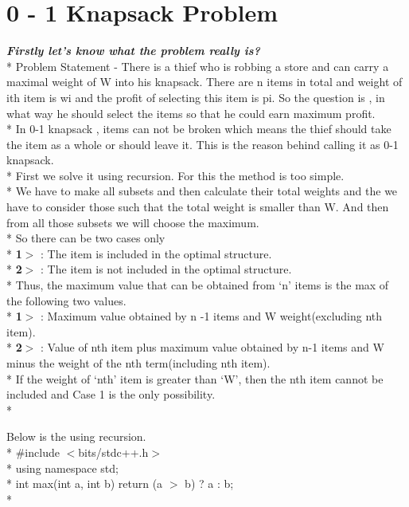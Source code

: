 \documentclass[12pt]{book}
\begin{document}
\chapter{0 - 1 Knapsack Problem}
\textbf{\textit{Firstly let’s know what the problem really is?}} \\*
\newline
Problem Statement - There is a thief who is robbing a store and can carry a maximal weight of W into his knapsack. There are n items in total and weight of ith item is wi and the profit of selecting this item is pi. So the question is , in what way he should select the items so that he could earn  maximum profit.\\*
\newline
In 0-1 knapsack , items can not be broken which means the thief should take the item as a whole or should leave it. This is the reason behind calling it as 0-1 knapsack.\\*
\newline
First we solve it using recursion. For this the method is too simple.\\*
\newline
We have to make all subsets and then calculate their total weights and the we have to consider those such that the total weight is smaller than W. And then from all those subsets we will choose the maximum.\\*
\newline
So there can be two cases only\\*
\textbf{1$>$} : The item is included in the optimal structure.\\*
\textbf{2$>$} : The item is not included in the optimal structure.\\*
\newline
Thus, the maximum value that can be obtained from ‘n’ items is the max of the following two values.\\*
\textbf{1$>$} : Maximum value obtained by n -1 items and W weight(excluding nth item).\\*
\textbf{2$>$} : Value of nth item plus maximum value obtained by n-1 items and W minus the weight of the nth term(including nth item).\\*
\newline
If the weight of ‘nth’ item is greater than ‘W’, then the nth item cannot be included and Case 1 is the only possibility.\\*

Below is the using recursion.\\*
\newline
$\#$include $<$bits/stdc++.h$>$ \\*
using namespace std; \\*
int max(int a, int b) { return (a $>$ b) ? a : b; } \\*
\end{document}
